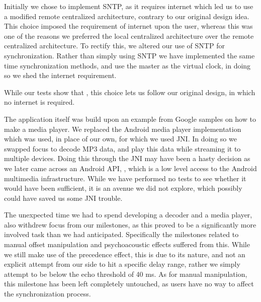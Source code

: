 Initially we chose to implement \ac{SNTP}, as it requires internet which led us to use a modified remote centralized architecture, contrary to our original design idea.
This choice imposed the requirement of internet upon the user, whereas this was one of the reasons we preferred the local centralized architecture over the remote centralized architecture.
To rectify this, we altered our use of \ac{SNTP} for synchronization.
Rather than simply using \ac{SNTP} we have implemented the same time synchronization methods, and use the master as the virtual clock, in doing so we shed the internet requirement.

While our tests show that , this choice lets us follow our original design, in which no internet is required.

\bigskip
The application itself was build upon an example from Google samples on how to make a media player.
We replaced the Android media player implementation which was used, in place of our own, for which we used \ac{JNI}.
In doing so we swapped focus to decode MP3 data, and play this data while streaming it to multiple devices.
Doing this through the \ac{JNI} may have been a hasty decision as we later came across an Android API, , which is a low level access to the Android multimedia infrastructure.
While we have performed no tests to see whether it would have been sufficient, it is an avenue we did not explore, which possibly could have saved us some \ac{JNI} trouble.

The unexpected time we had to spend developing a decoder and a media player, also withdrew focus from our milestones, as this proved to be a significantly more involved task than we had anticipated.
Specifically the milestones related to manual offset manipulation and psychoacoustic effects suffered from this.
While we still make use of the precedence effect, this is due to its nature, and not an explicit attempt from our side to hit a specific delay range, rather we simply attempt to be below the echo threshold of 40 ms.
As for manual manipulation, this milestone has been left completely untouched, as users have no way to affect the synchronization process.

